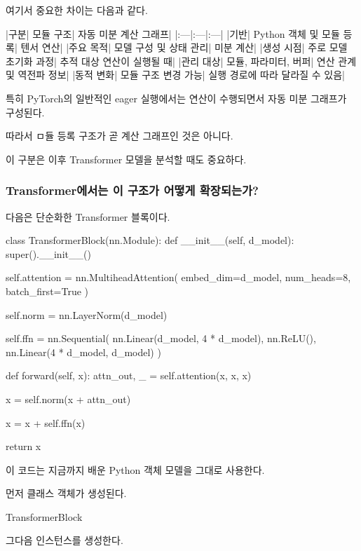 여기서 중요한 차이는 다음과 같다.

\begin{dhktable}
|구분|	모듈 구조|	자동 미분 계산 그래프|
|:---|:---|:---|
|기반|	Python 객체 및 모듈 등록|	텐서 연산|
|주요 목적|	모델 구성 및 상태 관리|	미분 계산|
|생성 시점|	주로 모델 초기화 과정|	추적 대상 연산이 실행될 때|
|관리 대상|	모듈, 파라미터, 버퍼|	연산 관계 및 역전파 정보|
|동적 변화|	모듈 구조 변경 가능|	실행 경로에 따라 달라질 수 있음|
\end{dhktable}

특히 PyTorch의 일반적인 eager 실행에서는 연산이 수행되면서 자동 미분 그래프가 구성된다.

따라서 ㅁ듈 등록 구조가 곧 계산 그래프인 것은 아니다.

이 구분은 이후 Transformer 모델을 분석할 때도 중요하다.

\subsubsection{Transformer에서는 이 구조가 어떻게 확장되는가?}

다음은 단순화한 Transformer 블록이다.

\begin{dhkcode}
class TransformerBlock(nn.Module):
    def __init__(self, d_model):
        super().__init__()

        self.attention = nn.MultiheadAttention(
            embed_dim=d_model,
            num_heads=8,
            batch_first=True
        )

        self.norm = nn.LayerNorm(d_model)

        self.ffn = nn.Sequential(
            nn.Linear(d_model, 4 * d_model),
            nn.ReLU(),
            nn.Linear(4 * d_model, d_model)
        )

    def forward(self, x):
        attn_out, _ = self.attention(x, x, x)

        x = self.norm(x + attn_out)

        x = x + self.ffn(x)

        return x
\end{dhkcode}

이 코드는 지금까지 배운 Python 객체 모델을 그대로 사용한다.

먼저 클래스 객체가 생성된다.

\begin{dhkcode}
TransformerBlock
\end{dhkcode}

그다음 인스턴스를 생성한다.

